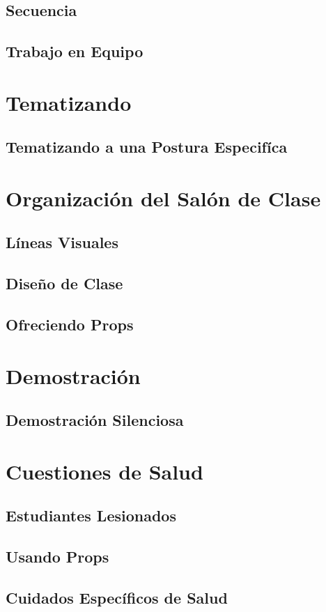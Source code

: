 \documentclass[11pt]{book}
\begin{document}
\subsection{Secuencia}
\subsection{Trabajo en Equipo}
\section{Tematizando}
\subsection{Tematizando a una Postura Especifíca}
\section{Organización del Salón de Clase}
\subsection{Líneas Visuales}
\subsection{Diseño de Clase}
\subsection{Ofreciendo Props}
\section{Demostración}
\subsection{Demostración Silenciosa}
\section{Cuestiones de Salud}
\subsection{Estudiantes Lesionados}
\subsection{Usando Props}
\subsection{Cuidados Específicos de Salud}
\end{document}
